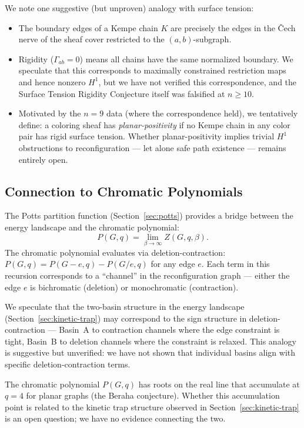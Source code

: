We note one suggestive (but unproven) analogy with surface tension:
\begin{itemize}
  \item The boundary edges of a Kempe chain $K$ are precisely the
    edges in the \v{C}ech nerve of the sheaf cover restricted to the
    $(a,b)$-subgraph.
  \item Rigidity ($\Gamma_{ab} = 0$) means all chains have the same
    normalized boundary. We speculate that this corresponds to maximally
    constrained restriction maps and hence nonzero $H^1$, but we have
    not verified this correspondence, and the Surface Tension Rigidity
    Conjecture itself was falsified at $n \geq 10$.
  \item Motivated by the $n = 9$ data (where the correspondence held),
    we tentatively define: a coloring sheaf has \emph{planar-positivity}
    if no Kempe chain in any color pair has rigid surface tension.
    Whether planar-positivity implies trivial $H^1$ obstructions to
    reconfiguration — let alone safe path existence — remains entirely
    open.
\end{itemize}

\subsection{Connection to Chromatic Polynomials}
\label{sec:chromatic}

The Potts partition function
(Section~\ref{sec:potts}) provides a bridge between the energy
landscape and the chromatic polynomial:
\begin{equation}\label{eq:potts-bridge}
  P(G, q) = \lim_{\beta \to \infty} Z(G, q, \beta).
\end{equation}
The chromatic polynomial evaluates via deletion-contraction:
$P(G, q) = P(G - e, q) - P(G / e, q)$ for any edge $e$. Each term in
this recursion corresponds to a ``channel'' in the reconfiguration
graph — either the edge $e$ is bichromatic (deletion) or monochromatic
(contraction).

We speculate that the two-basin structure in the energy landscape
(Section~\ref{sec:kinetic-trap}) may correspond to the sign structure
in deletion-contraction — Basin~A to contraction channels where the
edge constraint is tight, Basin~B to deletion channels where the
constraint is relaxed. This analogy is suggestive but unverified: we
have not shown that individual basins align with specific
deletion-contraction terms.

\begin{remark}
The chromatic polynomial $P(G, q)$ has roots on the real line that
accumulate at $q = 4$ for planar graphs (the Beraha conjecture). Whether
this accumulation point is related to the kinetic trap structure observed
in Section~\ref{sec:kinetic-trap} is an open question; we have no
evidence connecting the two.
\end{remark}

